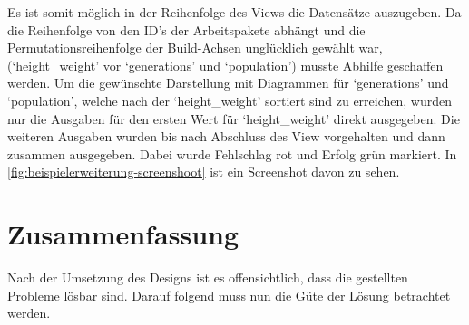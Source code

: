 Es ist somit möglich in der Reihenfolge des Views die Datensätze auszugeben.
Da die Reihenfolge von den ID's der Arbeitspakete abhängt
und die Permutationsreihenfolge der Build-Achsen unglücklich gewählt war, (`height\_weight' vor `generations' und `population') musste Abhilfe geschaffen werden.
Um die gewünschte Darstellung mit Diagrammen für `generations' und `population', welche nach der `height\_weight' sortiert sind zu erreichen, wurden nur die Ausgaben für den ersten Wert für `height\_weight' direkt ausgegeben.
Die weiteren Ausgaben wurden bis nach Abschluss des View vorgehalten und dann zusammen ausgegeben.
Dabei wurde Fehlschlag rot und Erfolg grün markiert.
In \cref{fig:beispielerweiterung-screenshoot} ist ein Screenshot davon zu sehen.




\section{Zusammenfassung}
\label{sec:imp:zusammenfassung}


Nach der Umsetzung des Designs ist es offensichtlich, dass die gestellten Probleme lösbar sind. Darauf folgend muss nun die Güte der Lösung betrachtet werden.
